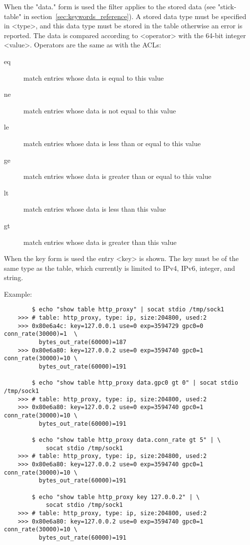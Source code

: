   When the "data." form is used the filter applies to the stored data (see
  "stick-table" in section~\ref{sec:keywords_reference}).  A stored data type must be specified
  in <type>, and this data type must be stored in the table otherwise an
  error is reported. The data is compared according to <operator> with the
  64-bit integer <value>.  Operators are the same as with the ACLs:

  \begin{description}
  \item[eq] match entries whose data is equal to this value
  \item[ne] match entries whose data is not equal to this value
  \item[le] match entries whose data is less than or equal to this value
  \item[ge] match entries whose data is greater than or equal to this value
  \item[lt] match entries whose data is less than this value
  \item[gt] match entries whose data is greater than this value
  \end{description}

  When the key form is used the entry <key> is shown.  The key must be of the
  same type as the table, which currently is limited to IPv4, IPv6, integer,
  and string.

  Example:
  \begin{verbatim}
        $ echo "show table http_proxy" | socat stdio /tmp/sock1
    >>> # table: http_proxy, type: ip, size:204800, used:2
    >>> 0x80e6a4c: key=127.0.0.1 use=0 exp=3594729 gpc0=0 conn_rate(30000)=1  \
          bytes_out_rate(60000)=187
    >>> 0x80e6a80: key=127.0.0.2 use=0 exp=3594740 gpc0=1 conn_rate(30000)=10 \
          bytes_out_rate(60000)=191

        $ echo "show table http_proxy data.gpc0 gt 0" | socat stdio /tmp/sock1
    >>> # table: http_proxy, type: ip, size:204800, used:2
    >>> 0x80e6a80: key=127.0.0.2 use=0 exp=3594740 gpc0=1 conn_rate(30000)=10 \
          bytes_out_rate(60000)=191

        $ echo "show table http_proxy data.conn_rate gt 5" | \
            socat stdio /tmp/sock1
    >>> # table: http_proxy, type: ip, size:204800, used:2
    >>> 0x80e6a80: key=127.0.0.2 use=0 exp=3594740 gpc0=1 conn_rate(30000)=10 \
          bytes_out_rate(60000)=191

        $ echo "show table http_proxy key 127.0.0.2" | \
            socat stdio /tmp/sock1
    >>> # table: http_proxy, type: ip, size:204800, used:2
    >>> 0x80e6a80: key=127.0.0.2 use=0 exp=3594740 gpc0=1 conn_rate(30000)=10 \
          bytes_out_rate(60000)=191
  \end{verbatim}

